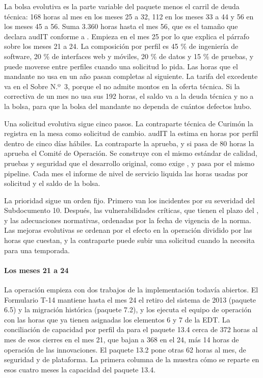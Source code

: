 La bolsa evolutiva es la parte variable del paquete menos el carril de deuda técnica: 168 horas al mes
en los meses 25 a 32, 112 en los meses 33 a 44 y 56 en los meses 45 a 56. Suma 3.360 horas hasta el mes
56, que es el tamaño que declara audIT conforme a . Empieza en el mes 25 por lo que
explica el párrafo sobre los meses 21 a 24. La composición por perfil es 45 \% de ingeniería de software, 20 \% de
interfaces web y móviles, 20 \% de datos y 15 \% de pruebas, y puede moverse entre perfiles cuando una
solicitud lo pida. Las horas que el mandante no usa en un año pasan completas al siguiente. La tarifa del
excedente va en el Sobre N.º~3, porque el  no admite montos en la oferta técnica. Si la
correctiva de un mes no usa sus 192 horas, el saldo va a la deuda técnica y no a la bolsa, para que la
bolsa del mandante no dependa de cuántos defectos hubo.

Una solicitud evolutiva sigue cinco pasos. La contraparte técnica de Curimón la registra en la mesa como
solicitud de cambio. audIT la estima en horas por perfil dentro de cinco días hábiles. La contraparte la
aprueba, y si pasa de 80 horas la aprueba el Comité de Operación. Se construye con el mismo estándar de
calidad, pruebas y seguridad que el desarrollo original, como exige , y pasa por el
mismo pipeline. Cada mes el informe de nivel de servicio liquida las horas usadas por solicitud y el
saldo de la bolsa.

La prioridad sigue un orden fijo. Primero van los incidentes por su severidad del Subdocumento 10.
Después, las vulnerabilidades críticas, que tienen el plazo del , y las adecuaciones
normativas, ordenadas por la fecha de vigencia de la norma. Las mejoras evolutivas se ordenan por el
efecto en la operación dividido por las horas que cuestan, y la contraparte puede subir una solicitud
cuando la necesita para una temporada.

\paragraph{Los meses 21 a 24} La operación empieza con dos trabajos de la implementación todavía
abiertos. El Formulario T-14 mantiene hasta el mes 24 el retiro del sistema de 2013 (paquete 6.5) y la
migración histórica (paquete 7.2), y los ejecuta el equipo de operación con las horas que ya tienen
asignadas los elementos 6 y 7 de la EDT. La conciliación de capacidad por perfil da para el paquete 13.4
cerca de 372 horas al mes de esos cierres en el mes 21, que bajan a 368 en el 24, más 14 horas de
operación de las innovaciones. El paquete 13.2 pone otras 62 horas al mes, de seguridad y de plataforma.
La primera columna de la  muestra cómo se reparte en esos cuatro meses la capacidad
del paquete 13.4.

